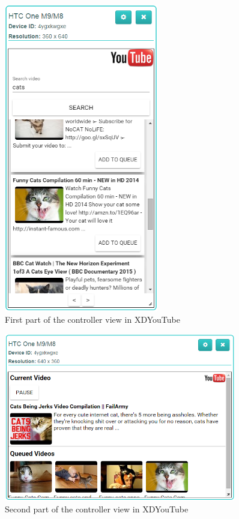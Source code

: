 \begin{figure}[H]
  \centering
    \includegraphics[width=0.6\textwidth]{images/screenshots/xdyt/controller_portrait_2.png}
	\caption[Screenshot XDYouTube: Controller view (first part)]{First part of the controller view in XDYouTube}
	\label{fig:xdyt_controller_portrait}
\end{figure}

\begin{figure}[H]
  \centering
    \includegraphics[width=0.9\textwidth]{images/screenshots/xdyt/controller_landscape_2.png}
	\caption[Screenshot XDYouTube: Controller view (second part)]{Second part of the controller view in XDYouTube}
	\label{fig:xdyt_controller_landscape}
\end{figure}

